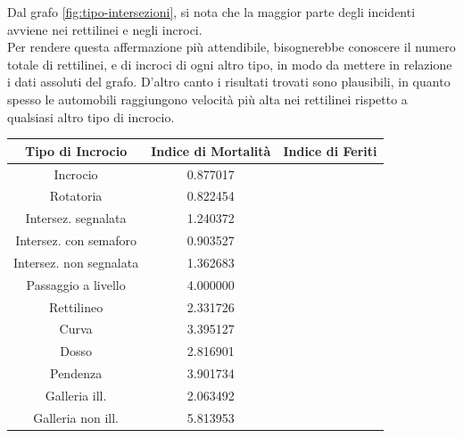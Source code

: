\documentclass[a4paper]{report}
\begin{document}
Dal grafo \ref{fig:tipo-intersezioni}, 
si nota che la maggior parte degli incidenti avviene nei rettilinei e negli incroci.\\
Per rendere questa affermazione più attendibile, 
bisognerebbe conoscere il numero totale di rettilinei, e di incroci di ogni altro tipo, in 
modo da mettere in relazione i dati assoluti del grafo. 
D'altro canto i risultati trovati sono plausibili, in quanto spesso le automobili raggiungono 
velocità più alta nei rettilinei rispetto a qualsiasi altro tipo di incrocio.

\begin{center}
    \def\arraystretch{1.5}%
    \begin{tabular}{ |c|c|c| } 
    \hline
    Tipo di Incrocio & Indice di Mortalità & Indice di Feriti \\ 
    \hline
    \rowcolor{TableGray}
    Incrocio                & 0.877017 \\
    Rotatoria               & 0.822454 \\
    \rowcolor{TableGray}
    Intersez. segnalata     & 1.240372 \\
    Intersez. con semaforo  & 0.903527 \\
    \rowcolor{TableGray}
    Intersez. non segnalata & 1.362683 \\
    Passaggio a livello     & 4.000000 \\
    \rowcolor{TableGray}
    Rettilineo              & 2.331726 \\
    Curva                   & 3.395127 \\
    \rowcolor{TableGray}
    Dosso                   & 2.816901 \\
    Pendenza                & 3.901734 \\
    \rowcolor{TableGray}
    Galleria ill.           & 2.063492 \\
    Galleria non ill.       & 5.813953 \\
    \hline
    \end{tabular}
\end{center}

\end{document}
